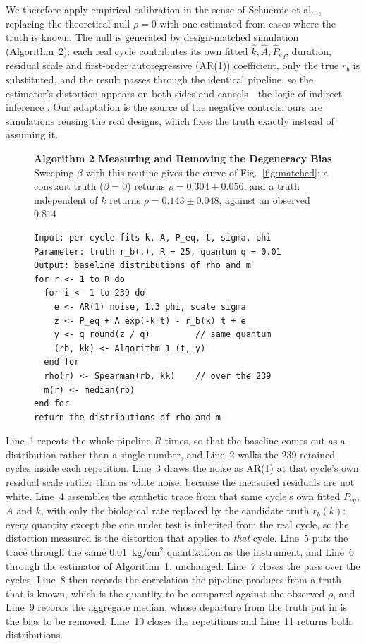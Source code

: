 \documentclass[runningheads]{llncs}
\newcommand{\pu}{\ensuremath{\mathrm{kg/cm^{2}}}}
\newcommand{\rb}{\ensuremath{r_{b}}}
\newcommand{\kh}{\ensuremath{\hat{k}}}
\begin{document}
We therefore apply empirical calibration in the sense of Schuemie et
al.~\cite{schuemie2014interpreting}, replacing the theoretical null
$\rho=0$ with one estimated from cases where the truth is known. The
null is generated by design-matched simulation (Algorithm~2): each real
cycle contributes its own fitted $\kh,\hat{A},\hat{P}_{eq}$, duration,
residual scale and first-order autoregressive
(AR(1)) coefficient, only the true \rb{} is
substituted, and the result passes through the identical pipeline, so
the estimator's distortion appears on both sides and cancels---the
logic of indirect inference \cite{gourieroux1993indirect}. Our adaptation is the source of the negative controls: ours are
simulations reusing the real designs, which fixes the truth exactly
instead of assuming it.

\begin{figure}[t]
\noindent\textbf{Algorithm 2  Measuring and Removing the Degeneracy Bias} Sweeping
$\beta$ with this routine gives the curve of Fig.~\ref{fig:matched};
a constant truth ($\beta=0$) returns $\rho=0.304\pm0.056$, and a truth
independent of $k$ returns $\rho=0.143\pm0.048$, against an observed
$0.814$

\begin{verbatim}
Input: per-cycle fits k, A, P_eq, t, sigma, phi
Parameter: truth r_b(.), R = 25, quantum q = 0.01
Output: baseline distributions of rho and m
for r <- 1 to R do
  for i <- 1 to 239 do
    e <- AR(1) noise, 1.3 phi, scale sigma
    z <- P_eq + A exp(-k t) - r_b(k) t + e
    y <- q round(z / q)         // same quantum
    (rb, kk) <- Algorithm 1 (t, y)
  end for
  rho(r) <- Spearman(rb, kk)    // over the 239
  m(r) <- median(rb)
end for
return the distributions of rho and m
\end{verbatim}

\end{figure}

Line~1 repeats the whole
pipeline $R$ times, so that the baseline comes out as a distribution
rather than a single number, and Line~2 walks the $239$ retained
cycles inside each repetition. Line~3 draws the noise as AR(1) at
that cycle's own residual scale rather than as white noise, because
the measured residuals are not white. Line~4 assembles the synthetic
trace from that same cycle's own fitted $P_{eq}$, $A$ and $k$, with
only the biological rate replaced by the candidate truth $\rb(k)$:
every quantity except the one under test is inherited from the real
cycle, so the distortion measured is the distortion that applies to
\emph{that} cycle. Line~5 puts the trace through the same
$0.01$~\pu{} quantization as the instrument, and Line~6 through the
estimator of Algorithm~1, unchanged. Line~7 closes the pass over the
cycles. Line~8 then records the correlation the pipeline produces
from a truth that is known, which is the quantity to be compared
against the observed $\rho$, and Line~9 records the aggregate median,
whose departure from the truth put in is the bias to be removed.
Line~10 closes the repetitions and Line~11 returns both
distributions.
\end{document}
